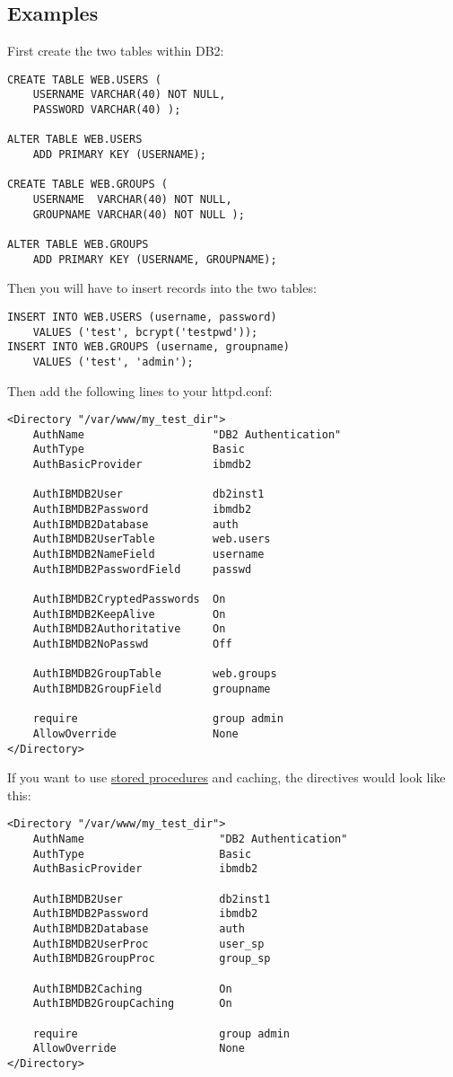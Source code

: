 \documentclass[11pt,letterpaper]{article}
\begin{document}
\subsection{Examples}
First create the two tables within DB2:
\begin{verbatim}
CREATE TABLE WEB.USERS (
    USERNAME VARCHAR(40) NOT NULL,
    PASSWORD VARCHAR(40) );

ALTER TABLE WEB.USERS
    ADD PRIMARY KEY (USERNAME);

CREATE TABLE WEB.GROUPS (
    USERNAME  VARCHAR(40) NOT NULL,
    GROUPNAME VARCHAR(40) NOT NULL );

ALTER TABLE WEB.GROUPS
    ADD PRIMARY KEY (USERNAME, GROUPNAME);
\end{verbatim}
Then you will have to insert records into the two tables:
\begin{verbatim}
INSERT INTO WEB.USERS (username, password)
    VALUES ('test', bcrypt('testpwd'));
INSERT INTO WEB.GROUPS (username, groupname)
    VALUES ('test', 'admin');
\end{verbatim}
Then add the following lines to your httpd.conf:
\begin{verbatim}
<Directory "/var/www/my_test_dir">
    AuthName                    "DB2 Authentication"
    AuthType                    Basic
    AuthBasicProvider           ibmdb2

    AuthIBMDB2User              db2inst1
    AuthIBMDB2Password          ibmdb2
    AuthIBMDB2Database          auth
    AuthIBMDB2UserTable         web.users
    AuthIBMDB2NameField         username
    AuthIBMDB2PasswordField     passwd

    AuthIBMDB2CryptedPasswords  On
    AuthIBMDB2KeepAlive         On
    AuthIBMDB2Authoritative     On
    AuthIBMDB2NoPasswd          Off

    AuthIBMDB2GroupTable        web.groups
    AuthIBMDB2GroupField        groupname

    require                     group admin
    AllowOverride               None
</Directory>
\end{verbatim}
If you want to use \hyperlink{hsps}{stored procedures} and caching, the directives would look like this:
\begin{verbatim}
<Directory "/var/www/my_test_dir">
    AuthName                     "DB2 Authentication"
    AuthType                     Basic
    AuthBasicProvider            ibmdb2

    AuthIBMDB2User               db2inst1
    AuthIBMDB2Password           ibmdb2
    AuthIBMDB2Database           auth
    AuthIBMDB2UserProc           user_sp
    AuthIBMDB2GroupProc          group_sp

    AuthIBMDB2Caching            On
    AuthIBMDB2GroupCaching       On

    require                      group admin
    AllowOverride                None
</Directory>
\end{verbatim}
\newpage
\end{document}
